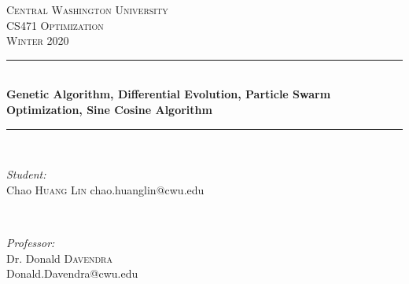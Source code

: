 \documentclass[12pt]{article}
\begin{document}
    
    \begin{titlepage}
        
        \newcommand{\HRule}{\rule{\linewidth}{0.5mm}} %
        
        \center %
        
        
        \textsc{\LARGE Central Washington University}\\[1.5cm] %
        \textsc{\Large CS471 Optimization}\\[0.5cm] %
        \textsc{\large Winter 2020}\\[0.5cm] %
        
        
        \HRule \\[0.4cm]
        { \huge \bfseries Genetic Algorithm, Differential Evolution, Particle Swarm Optimization, Sine Cosine Algorithm}\\[0.2cm] %
        \HRule \\[1cm]
        
        
        \begin{minipage}{0.5\textwidth}
            \begin{flushleft} \large
                \emph{Student:}\\
                Chao \textsc{Huang Lin} chao.huanglin@cwu.edu
                
                
            \end{flushleft}
        \end{minipage}
        ~
        \begin{minipage}{0.45\textwidth}
            \begin{flushright} \large
                \emph{Professor:} \\
                Dr. Donald \textsc{Davendra}\\ %
                Donald.Davendra@cwu.edu
            \end{flushright}
        \end{minipage}\\[0.5cm]
        

\end{titlepage}
\end{document}
